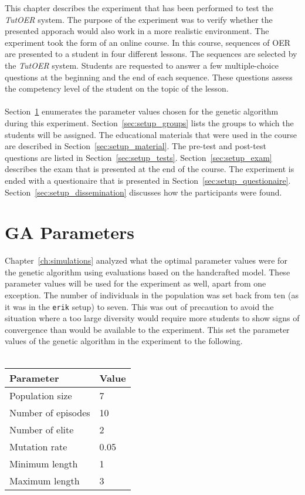 This chapter describes the experiment that has been performed to test the
\emph{TutOER} system. The purpose of the experiment was to verify whether the
presented apporach would also work in a more realistic environment. The
experiment took the form of an online course. In this course, sequences of OER
are presented to a student in four different lessons. The sequences are
selected by the \emph{TutOER} system. Students are requested to answer a few
multiple-choice questions at the beginning and the end of each sequence. These
questions assess the competency level of the student on the topic of the
lesson.\\\\
\noindent
Section~\ref{sec:setup_params} enumerates the parameter values chosen for the
genetic algorithm during this experiment. Section~\ref{sec:setup_groups} lists the
groups to which the students will be assigned. The educational materials that
were used in the course are described in Section~\ref{sec:setup_material}. The
pre-test and post-test questions are listed in Section~\ref{sec:setup_tests}.
Section~\ref{sec:setup_exam} describes the exam that is presented at the end of
the course. The experiment is ended with a questionaire that is presented in
Section~\ref{sec:setup_questionaire}. Section~\ref{sec:setup_dissemination} discusses
how the participants were found.
\section{GA Parameters}
\label{sec:setup_params}
Chapter~\ref{ch:simulations} analyzed what the optimal parameter values were
for the genetic algorithm using evaluations based on the handcrafted model.
These parameter values will be used for the experiment as well, apart from one
exception. The number of individuals in the population was set back from ten
(as it was in the \texttt{erik} setup) to seven. This was out of precaution to
avoid the situation where a too large diversity would require more students to
show signs of convergence than would be available to the experiment. This set
the parameter values of the genetic algorithm in the experiment to the
following.\\\\
\begin{tabular}{ll}\hline
	\textbf{Parameter} &  \textbf{Value}\\\hline
	Population size & 7 \\
	Number of episodes & 10 \\
	Number of elite & 2 \\
	Mutation rate & 0.05 \\
	Minimum length & 1 \\
	Maximum length & 3 \\
\end{tabular}
